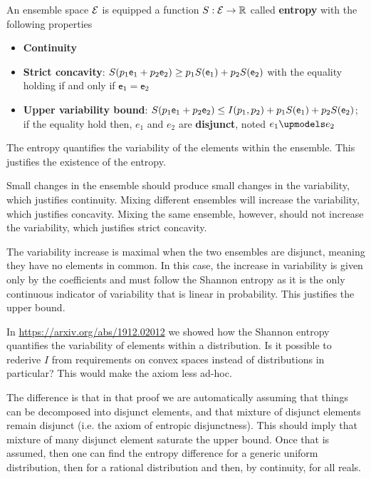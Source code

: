 \begin{axiom}
	An ensemble space $\mathcal{E}$ is equipped a function $S : \mathcal{E} \to \mathbb{R}$ called \textbf{entropy} with the following properties
	\begin{itemize}
		\item \textbf{Continuity}
		\item \textbf{Strict concavity}: $S(p_1\mathsf{e}_1 + p_2 \mathsf{e}_2) \geq p_1 S(\mathsf{e}_1) + p_2 S(\mathsf{e}_2)$ with the equality holding if and only if $\mathsf{e}_1 = \mathsf{e}_2$
		\item \textbf{Upper variability bound}: $S(p_1\mathsf{e}_1 + p_2 \mathsf{e}_2) \leq I(p_1, p_2) + p_1 S(\mathsf{e}_1) + p_2 S(\mathsf{e}_2)$; if the equality hold then, $e_1$ and $e_2$ are \textbf{disjunct}, noted $e_1 \disjunct e_2$
	\end{itemize}
\end{axiom}

\begin{justification}
	The entropy quantifies the variability of the elements within the ensemble. This justifies the existence of the entropy.
	
	Small changes in the ensemble should produce small changes in the variability, which justifies continuity. Mixing different ensembles will increase the variability, which justifies concavity. Mixing the same ensemble, however, should not increase the variability, which justifies strict concavity. 
	
	The variability increase is maximal when the two ensembles are disjunct, meaning they have no elements in common. In this case, the increase in variability is given only by the coefficients and must follow the Shannon entropy as it is the only continuous indicator of variability that is linear in probability. This justifies the upper bound.
\end{justification}

\begin{remark}
	In \url{https://arxiv.org/abs/1912.02012} we showed how the Shannon entropy quantifies the variability of elements within a distribution. Is it possible to rederive $I$ from requirements on convex spaces instead of distributions in particular? This would make the axiom less ad-hoc.
	
	The difference is that in that proof we are automatically assuming that things can be decomposed into disjunct elements, and that mixture of disjunct elements remain disjunct (i.e. the axiom of entropic disjunctness). This should imply that mixture of many disjunct element saturate the upper bound. Once that is assumed, then one can find the entropy difference for a generic uniform distribution, then for a rational distribution and then, by continuity, for all reals.
\end{remark}


